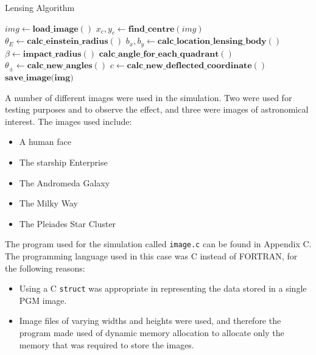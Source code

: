 \documentclass[a4paper]{IEEEtran}
\begin{document}
    \begin{algorithm}
        \caption{Lensing Algorithm} 
        \label{alg:lense} 
        \begin{algorithmic}[1]
                \State $img \leftarrow \textbf{load\_image}()$
                \State $x_c, y_c \leftarrow \textbf{find\_centre}(img)$
                \State $\theta_E \leftarrow \textbf{calc\_einstein\_radius}()$
                    \State $b_x, b_y \leftarrow \textbf{calc\_location\_lensing\_body}()$
                    \State $\beta \leftarrow \textbf{impact\_radius}()$
                    \State $\textbf{calc\_angle\_for\_each\_quadrant}()$
                    \State $\theta_{\pm} \leftarrow \textbf{calc\_new\_angles}()$
                    \State $c \leftarrow \textbf{calc\_new\_deflected\_coordinate}()$
                \EndFor
                \State $\textbf{save\_image(img)}$ 
            \EndProcedure
        \end{algorithmic} 
    \end{algorithm} 


    A number of different images were used in the simulation. Two were used
    for testing purposes and to observe the effect, and three were images
    of astronomical interest. The images used include:
    \begin{itemize}
        \item A human face
        \item The starship Enterprise
        \item The Andromeda Galaxy
        \item The Milky Way
        \item The Pleiades Star Cluster
    \end{itemize}

    The program used for the simulation called \texttt{image.c} can
    be found in Appendix C. The programming language used in this case
    was C instead of FORTRAN, for the following reasons:
    \begin{itemize}
        \item Using a C \texttt{struct} was appropriate in representing
              the data stored in a single PGM image.
        \item Image files of varying widths and heights were used, and 
              therefore the program made used of dynamic memory allocation
              to allocate only the memory that was required to store
              the images.
    \end{itemize}
\end{document}
